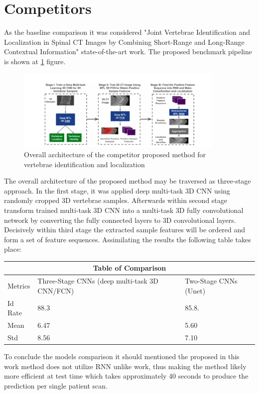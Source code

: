 \section{Competitors}
As the baseline comparison it was considered \cite{Liao2018} "Joint Vertebrae Identification and Localization in Spinal CT Images by Combining Short-Range and Long-Range Contextual Information" state-of-the-art work. The proposed benchmark pipeline is shown at \ref{fig:competitor} figure.

\begin{figure}[h]
    \centering \includegraphics[width=10cm]{images/competitor.png}
    \caption {Overall architecture of the competitor proposed method for vertebrae identification and localization}
    \label{fig:competitor}
\end{figure}

The overall architecture of the proposed method may be traversed as three-stage approach. In the first stage, it was applied deep multi-task 3D CNN using randomly cropped 3D vertebrae samples. Afterwards within second stage transform trained multi-task 3D CNN into a multi-task 3D fully convolutional network by converting the fully connected layers to 3D convolutional layers. Decisively within third stage the extracted sample features will be ordered and form a set of feature sequences. Assimilating the results the following table takes place:

\begin{tabular}{|p{2cm}||p{7cm}|p{5cm}|}
 \hline
 \multicolumn{3}{|c|}{Table of Comparison} \\
 \hline
 Metrics & Three-Stage CNNs (deep multi-task 3D CNN/FCN) & Two-Stage CNNs (Unet)\\
 \hline
 Id Rate   & 88.3 & 85.8.    \\
 Mean      & 6.47  & 5.60    \\
 Std       & 8.56  & 7.10    \\
 \hline
\end{tabular}


To conclude the models comparison it should mentioned the proposed in this work method does not utilize RNN unlike \cite{Liao2018} work, thus making the method likely more efficient at test time which takes approximately 40 seconds to produce the prediction per single patient scan. 